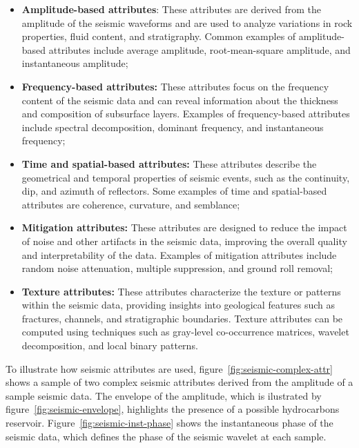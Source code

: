 \begin{itemize}
    \item \textbf{Amplitude-based attributes}: These attributes are derived from the amplitude of the seismic waveforms and are used to analyze variations in rock properties, fluid content, and stratigraphy.
        Common examples of amplitude-based attributes include average amplitude, root-mean-square amplitude, and instantaneous amplitude;
    \item \textbf{Frequency-based attributes:} These attributes focus on the frequency content of the seismic data and can reveal information about the thickness and composition of subsurface layers.
        Examples of frequency-based attributes include spectral decomposition, dominant frequency, and instantaneous frequency;
    \item \textbf{Time and spatial-based attributes:} These attributes describe the geometrical and temporal properties of seismic events, such as the continuity, dip, and azimuth of reflectors.
        Some examples of time and spatial-based attributes are coherence, curvature, and semblance;
    \item \textbf{Mitigation attributes:} These attributes are designed to reduce the impact of noise and other artifacts in the seismic data, improving the overall quality and interpretability of the data.
        Examples of mitigation attributes include random noise attenuation, multiple suppression, and ground roll removal;
    \item \textbf{Texture attributes:} These attributes characterize the texture or patterns within the seismic data, providing insights into geological features such as fractures, channels, and stratigraphic boundaries.
        Texture attributes can be computed using techniques such as gray-level co-occurrence matrices, wavelet decomposition, and local binary patterns.
\end{itemize}

To illustrate how seismic attributes are used, figure~\ref{fig:seismic-complex-attr} shows a sample of two complex seismic attributes derived from the amplitude of a sample seismic data.
The envelope of the amplitude, which is ilustrated by figure~\ref{fig:seismic-envelope}, highlights the presence of a possible hydrocarbons reservoir.
Figure~\ref{fig:seismic-inst-phase} shows the instantaneous phase of the seismic data, which defines the phase of the seismic wavelet at each sample.

